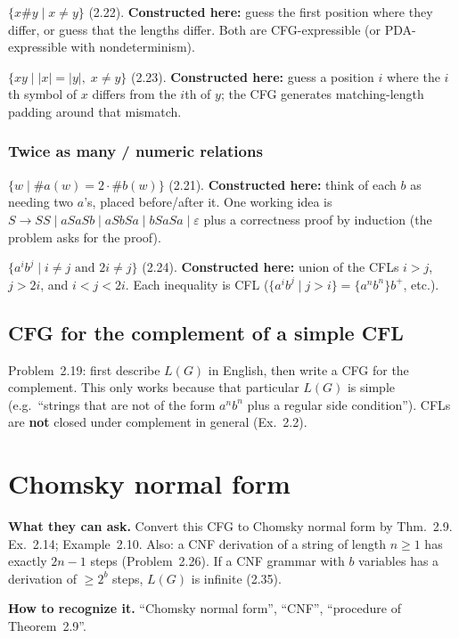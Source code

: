 \documentclass[11pt,a4paper]{article}
\newcommand{\eps}{\varepsilon}
\begin{document}
$\{x\#y\mid x\neq y\}$ (2.22). \textbf{Constructed here:} guess the
first position where they differ, or guess that the lengths differ.
Both are CFG-expressible (or PDA-expressible with nondeterminism).

$\{xy\mid |x|=|y|,\; x\neq y\}$ (2.23). \textbf{Constructed here:}
guess a position $i$ where the $i$th symbol of $x$ differs from the
$i$th of $y$; the CFG generates matching-length padding around that
mismatch.

\subsubsection{Twice as many / numeric relations}

$\{w\mid \#a(w)=2\cdot\#b(w)\}$ (2.21). \textbf{Constructed here:}
think of each $b$ as needing two $a$'s, placed before/after it. One
working idea is
$S\to SS\mid aSaSb\mid aSbSa\mid bSaSa\mid\eps$ plus a correctness
proof by induction (the problem asks for the proof).

$\{a^ib^j\mid i\neq j\text{ and }2i\neq j\}$ (2.24).
\textbf{Constructed here:} union of the CFLs $i>j$, $j>2i$, and
$i<j<2i$. Each inequality is CFL
($\{a^ib^j\mid j>i\}= \{a^nb^n\}b^+$, etc.).

\subsection{CFG for the complement of a simple CFL}

Problem~2.19: first describe $L(G)$ in English, then write a CFG for
the complement. This only works because that particular $L(G)$ is
simple (e.g.\ ``strings that are not of the form $a^nb^n$ plus a
regular side condition''). CFLs are \textbf{not} closed under
complement in general (Ex.~2.2).

\section{Chomsky normal form}
\label{type:cnf}

\textbf{What they can ask.}
Convert this CFG to Chomsky normal form by Thm.~2.9. Ex.~2.14;
Example~2.10. Also: a CNF derivation of a string of length $n\ge 1$
has exactly $2n-1$ steps (Problem~2.26). If a CNF grammar with $b$
variables has a derivation of $\ge 2^b$ steps, $L(G)$ is infinite
(2.35).

\textbf{How to recognize it.}
``Chomsky normal form'', ``CNF'', ``procedure of Theorem~2.9''.
\end{document}
